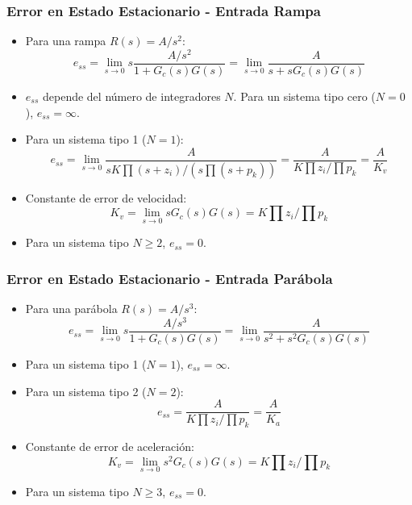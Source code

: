 \documentclass[aspectratio=169,handout]{beamer}
\theoremstyle{definition}
\theoremstyle{plain}
\theoremstyle{remark}
\begin{document}
\begin{frame}[<+->]\frametitle{Error en Estado Estacionario - Entrada Rampa}
\begin{itemize}
	\item Para una rampa $R(s) = A/s^2$:
	\begin{equation*}
		e_{ss} = \lim_{s \rightarrow 0} s \frac{A/s^2}{1 + G_c(s)G(s)} = \lim_{s \rightarrow 0} \frac{A}{s + sG_c(s)G(s)}
	\end{equation*}
	\item $e_{ss}$ depende del número de integradores $N$. Para un sistema tipo cero ($N = 0$), $e_{ss} = \infty$.
	\item Para un sistema tipo 1 ($N = 1$):
	\begin{equation*}
		e_{ss} = \lim_{s \rightarrow 0} \frac{A}{s K \prod (s+z_i)/ \left( s \prod (s + p_k) \right)} = \frac{A}{K \prod z_i/ \prod p_k } = \frac{A}{K_v}
	\end{equation*}
	\item Constante de error de velocidad:
	\begin{equation*}
		K_v = \lim_{s \rightarrow 0} sG_c(s)G(s) = K \prod z_i/ \prod p_k
	\end{equation*}
	\item Para un sistema tipo $N \geq 2$, $e_{ss} = 0$.
\end{itemize}
\end{frame}

\begin{frame}[<+->]\frametitle{Error en Estado Estacionario - Entrada Parábola}
\begin{itemize}
	\item Para una parábola $R(s) = A/s^3$:
	\begin{equation*}
		e_{ss} = \lim_{s \rightarrow 0} s \frac{A/s^3}{1 + G_c(s)G(s)} = \lim_{s \rightarrow 0} \frac{A}{s^2 + s^2G_c(s)G(s)}
	\end{equation*}
	\item Para un sistema tipo 1 ($N = 1$), $e_{ss} = \infty$.
	\item Para un sistema tipo 2 ($N = 2$):
	\begin{equation*}
		e_{ss} = \frac{A}{K \prod z_i/ \prod p_k } = \frac{A}{K_a}
	\end{equation*}
	\item Constante de error de aceleración:
	\begin{equation*}
		K_v = \lim_{s \rightarrow 0} s^2G_c(s)G(s) = K \prod z_i/ \prod p_k
	\end{equation*}
	\item Para un sistema tipo $N \geq 3$, $e_{ss} = 0$.
\end{itemize}
\end{frame}
\end{document}
